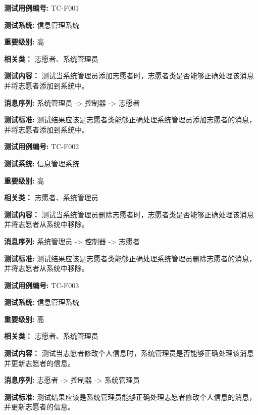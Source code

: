 \begin{framed} \textbf{测试用例编号:} TC-F001

\textbf{测试系统:} 信息管理系统

\textbf{重要级别:} 高

\textbf{相关类：} 志愿者、系统管理员

\textbf{测试内容：} 测试当系统管理员添加志愿者时，志愿者类是否能够正确处理该消息并将志愿者添加到系统中。

\textbf{消息序列:} 系统管理员 -> 控制器 -> 志愿者

\textbf{测试标准:} 测试结果应该是志愿者类能够正确处理系统管理员添加志愿者的消息，并将志愿者添加到系统中。

\begin{center}  \end{center} \end{framed}

\begin{framed} \textbf{测试用例编号:} TC-F002

\textbf{测试系统:} 信息管理系统

\textbf{重要级别:} 高

\textbf{相关类：} 志愿者、系统管理员

\textbf{测试内容：} 测试当系统管理员删除志愿者时，志愿者类是否能够正确处理该消息并将志愿者从系统中移除。

\textbf{消息序列:} 系统管理员 -> 控制器 -> 志愿者

\textbf{测试标准:} 测试结果应该是志愿者类能够正确处理系统管理员删除志愿者的消息，并将志愿者从系统中移除。

\begin{center}  \end{center} \end{framed}

\begin{framed} \textbf{测试用例编号:} TC-F003

\textbf{测试系统:} 信息管理系统

\textbf{重要级别:} 高

\textbf{相关类：} 志愿者、系统管理员

\textbf{测试内容：} 测试当志愿者修改个人信息时，系统管理员是否能够正确处理该消息并更新志愿者的信息。

\textbf{消息序列:} 志愿者 -> 控制器 -> 系统管理员

\textbf{测试标准:} 测试结果应该是系统管理员能够正确处理志愿者修改个人信息的消息，并更新志愿者的信息。

\begin{center}  \end{center} \end{framed}

